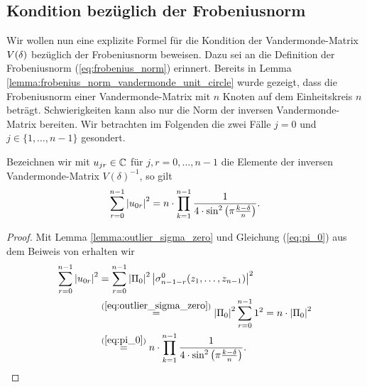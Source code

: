 \subsection{Kondition bezüglich der Frobeniusnorm}
Wir wollen nun eine explizite Formel für die Kondition der Vandermonde-Matrix
$V \! \left( \delta \right)$ bezüglich der Frobeniusnorm beweisen.
Dazu sei an die Definition der Frobeniusnorm (\ref{eq:frobenius_norm}) erinnert.
Bereits in Lemma \ref{lemma:frobenius_norm_vandermonde_unit_circle} wurde
gezeigt, dass die Frobeniusnorm einer Vandermonde-Matrix mit $n$ Knoten auf dem
Einheitskreis $n$ beträgt.
Schwierigkeiten kann also nur die Norm der inversen Vandermonde-Matrix
bereiten.  Wir betrachten im Folgenden die zwei Fälle $j=0$ und
$j \in \{1, \dots, n-1\}$ gesondert.

\begin{lemma}
    \label{lemma:inverse_outlier_zero_row_quadratic_sum}
    Bezeichnen wir mit $u_{jr} \in \mathbb{C}$ für $j, r = 0, \dots, n-1$ die Elemente
    der inversen Vandermonde-Matrix $V(\delta)^{-1}$, so gilt
    \[
        \sum_{r=0}^{n-1} \left\lvert u_{0r} \right\rvert^2
        = n \cdot \prod_{k=1}^{n-1} \frac{1}{4 \cdot \sin^2 \left( \pi \frac{k-\delta}{n} \right)}.
    \]
\end{lemma}
\begin{proof}
    Mit Lemma \ref{lemma:outlier_sigma_zero} und Gleichung (\ref{eq:pi_0}) aus
    dem Beiweis von 
    erhalten wir
    \[
        \begin{split}
            \sum_{r=0}^{n-1} \left\lvert u_{0r} \right\rvert^2
            &= \sum_{r=0}^{n-1} \left\lvert \Pi_0 \right\rvert^2 \left\lvert \sigma_{n-1-r}^{0}(z_1, \dots, z_{n-1}) \right\rvert^2\\
            &\overset{(\ref{eq:outlier_sigma_zero})}=
                \left\lvert \Pi_0 \right\rvert^2 \sum_{r=0}^{n-1} 1^2
            = n \cdot \left\lvert \Pi_0 \right\rvert^2\\
            &\overset{(\ref{eq:pi_0})}=
                n \cdot \prod_{k=1}^{n-1} \frac{1}{4 \cdot \sin^2 \left( \pi \frac{k-\delta}{n} \right)}.
        \end{split}
    \]
\end{proof}


